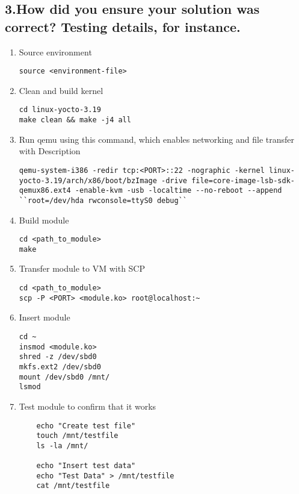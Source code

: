 \documentclass[onecolumn, draftclsnofoot,10pt, compsoc]{IEEEtran}
\begin{document}
	\subsection*{3.How did you ensure your solution was correct? Testing details, for instance.}

	\begin{enumerate}

	\item Source environment
	\begin{lstlisting}
source <environment-file>
\end{lstlisting}

	\item Clean and build kernel
	\begin{lstlisting}
cd linux-yocto-3.19
make clean && make -j4 all
\end{lstlisting}

	\item Run qemu using this command, which enables networking and file transfer with Description
	\begin{lstlisting}
qemu-system-i386 -redir tcp:<PORT>::22 -nographic -kernel linux-yocto-3.19/arch/x86/boot/bzImage -drive file=core-image-lsb-sdk-qemux86.ext4 -enable-kvm -usb -localtime --no-reboot --append ``root=/dev/hda rwconsole=ttyS0 debug``
\end{lstlisting}

\item Build module
\begin{lstlisting}
cd <path_to_module>
make
\end{lstlisting}

	\item Transfer module to VM with SCP
	\begin{lstlisting}
cd <path_to_module>
scp -P <PORT> <module.ko> root@localhost:~
\end{lstlisting}

	\item Insert module
	\begin{lstlisting}
cd ~
insmod <module.ko>
shred -z /dev/sbd0
mkfs.ext2 /dev/sbd0
mount /dev/sbd0 /mnt/
lsmod
\end{lstlisting}

	\item Test module to confirm that it works
	\begin{lstlisting}
	echo "Create test file"
	touch /mnt/testfile
	ls -la /mnt/

	echo "Insert test data"
	echo "Test Data" > /mnt/testfile
	cat /mnt/testfile


\end{lstlisting}
\end{enumerate}
\end{document}
